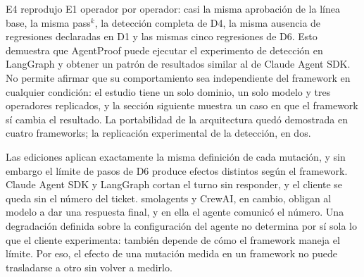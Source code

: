 \par
{} E4 reprodujo E1 operador por operador: casi la misma aprobación de la línea base, la misma pass$^k$, la detección completa de D4, la misma ausencia de regresiones declaradas en D1 y las mismas cinco regresiones de D6. Esto demuestra que AgentProof puede ejecutar el experimento de detección en LangGraph y obtener un patrón de resultados similar al de Claude Agent SDK. No permite afirmar que su comportamiento sea independiente del framework en cualquier condición: el estudio tiene un solo dominio, un solo modelo y tres operadores replicados, y la sección siguiente muestra un caso en que el framework sí cambia el resultado. La portabilidad de la arquitectura quedó demostrada en cuatro frameworks; la replicación experimental de la detección, en dos.
\par
{} Las ediciones aplican exactamente la misma definición de cada mutación, y sin embargo el límite de pasos de D6 produce efectos distintos según el framework. Claude Agent SDK y LangGraph cortan el turno sin responder, y el cliente se queda sin el número del ticket. smolagents y CrewAI, en cambio, obligan al modelo a dar una respuesta final, y en ella el agente comunicó el número.
Una degradación definida sobre la configuración del agente no determina por sí sola lo que el cliente experimenta: también depende de cómo el framework maneja el límite. Por eso, el efecto de una mutación medida en un framework no puede trasladarse a otro sin volver a medirlo.
\par

